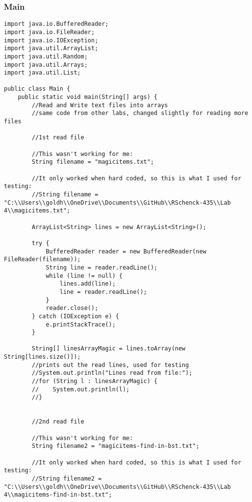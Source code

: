 \documentclass[10pt]{article}
\begin{document}
\subsubsection{Main}
\lstset{numbers=left, numberstyle=\tiny, stepnumber=1, numbersep=5pt, basicstyle=\footnotesize\ttfamily}
\begin{lstlisting}[frame=single, ]  
import java.io.BufferedReader;
import java.io.FileReader;
import java.io.IOException;
import java.util.ArrayList;
import java.util.Random;
import java.util.Arrays;
import java.util.List;

public class Main {
    public static void main(String[] args) {
        //Read and Write text files into arrays
        //same code from other labs, changed slightly for reading more files

        //1st read file

        //This wasn't working for me: 
        String filename = "magicitems.txt";

        //It only worked when hard coded, so this is what I used for testing:
        //String filename = "C:\\Users\\goldh\\OneDrive\\Documents\\GitHub\\RSchenck-435\\Lab 4\\magicitems.txt";

        ArrayList<String> lines = new ArrayList<String>();

        try {
            BufferedReader reader = new BufferedReader(new FileReader(filename));
            String line = reader.readLine();
            while (line != null) {
                lines.add(line);
                line = reader.readLine();
            }
            reader.close();
        } catch (IOException e) {
            e.printStackTrace();
        }

        String[] linesArrayMagic = lines.toArray(new String[lines.size()]);
        //prints out the read lines, used for testing
        //System.out.println("Lines read from file:");
        //for (String l : linesArrayMagic) {
        //    System.out.println(l);
        //}


        //2nd read file

        //This wasn't working for me: 
        String filename2 = "magicitems-find-in-bst.txt";

        //It only worked when hard coded, so this is what I used for testing:
        //String filename2 = "C:\\Users\\goldh\\OneDrive\\Documents\\GitHub\\RSchenck-435\\Lab 4\\magicitems-find-in-bst.txt";


\end{lstlisting}
\end{document}
